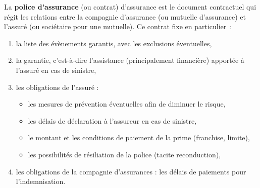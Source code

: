 \begin{f}
	
	La \textbf{police d'assurance} (ou contrat) d'assurance est le document contractuel qui régit les relations entre la compagnie d'assurance (ou mutuelle d'assurance) et l'assuré (ou sociétaire pour une mutuelle). 
	Ce contrat fixe en particulier~:
	
	\begin{enumerate}
		\item  la liste des évènements garantis, avec les exclusions éventuelles,
		\item  la garantie, c'est-à-dire l'assistance (principalement financière) apportée à l'assuré en cas de sinistre,
		\item  les obligations de l'assuré :
		\begin{itemize}
			\item les mesures de prévention éventuelles afin de diminuer le risque,
			\item les délais de déclaration à l'assureur en cas de sinistre,
			\item le montant et les conditions de paiement de la prime (franchise, limite),
			\item les possibilités de résiliation de la police (tacite reconduction),
		\end{itemize}
		\item  les obligations de la compagnie d'assurances : les délais de paiements pour l'indemnisation.
		
	\end{enumerate}
	
\end{f}
